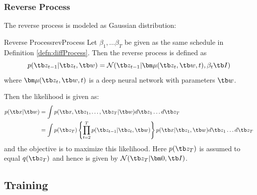 \documentclass{article}
\begin{document}
        \subsubsection{Reverse Process}
            The reverse process is modeled as Gaussian distribution:
            \begin{defn}{Reverse Process}{revProcess}
                Let $\beta_1,...\beta_T$ be given as the same schedule in Definition \ref{defn:diffProcess}. Then the reverse process is defined as
                \[
                p(\tb z_{t-1}|\tb z_t,\tb w)=\mathcal{N}(\tb z_{t-1}|\bm\mu(\tb z_t, \tb w, t),\beta_t\tb I)
                \]
                where $\bm\mu(\tb z_t,\tb w, t)$ is a deep neural network with parameters $\tb w$.
            \end{defn}
            Then the likelihood is given as:
            \begin{align*}
                p(\tb x| \tb w) &= \int p(\tb x,\tb z_1,\dots,\tb z_T|\tb w)d\tb z_1 \dots d\tb z_T
            \\  &= \int p(\tb z_T)\left\{ \prod_{t=2}^{T}p(\tb z_{t-1}|\tb z_t,\tb w) \right\}p(\tb x|\tb z_1,\tb w)d\tb z_1 \dots d\tb z_T
            \end{align*}
            and the objective is to maximize this likelihood. Here $p(\tb z_T)$ is assumed to equal $q(\tb z_T)$ and hence is given by $\mathcal{N}(\tb z_T|\bm 0,\tb I)$.
    \subsection{Training}
\end{document}
